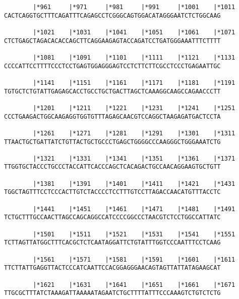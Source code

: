 \documentclass{article}
\begin{document}
\begin{Verbatim}
        |*961     |*971     |*981     |*991     |*1001    |*1011
CACTCAGGTGCTTTCAGATTTCAGAGCCTCGGGCAGTGGACATAGGGAATCTCTGGCAAG
                                                            
        |*1021    |*1031    |*1041    |*1051    |*1061    |*1071
CTCTGAGCTAGACACACCAGCTTCAGGAAGAGTACCAGATCCTGATGGGAAATTTCTTTT
                                                            
        |*1081    |*1091    |*1101    |*1111    |*1121    |*1131
CCCCATTCCTTTTCCCTCCTGAGTGGAGGGAGTCCTCTTCTTCGCCTCCCTGAGAATTGC
                                                            
        |*1141    |*1151    |*1161    |*1171    |*1181    |*1191
TGTGCTCTGTATTGAGAGCACCTGCCTGCTGACTTAGCTCAAAGGCAAGCCAGAACCCTT
                                                            
        |*1201    |*1211    |*1221    |*1231    |*1241    |*1251
CCCTGAAGACTGGCAAGAGGTGGTGTTTAGAGCAACGTCCAGGCTAAGAGATGACTCCTA
                                                            
        |*1261    |*1271    |*1281    |*1291    |*1301    |*1311
TTAACTGCTGATTATCTGTTACTGCTGCCCTGAGCTGGGGCCCAAGGGCTGGGAAATCTG
                                                            
        |*1321    |*1331    |*1341    |*1351    |*1361    |*1371
TTGGTGCTACCCTGCCCTACCATTCACCCAGCTCACAGACTGCCAACAGGAAGTGCTGTT
                                                            
        |*1381    |*1391    |*1401    |*1411    |*1421    |*1431
TGGCTAGTTTCCTCCCACTTGTCTACCCCTCCTTTGTCCTTAGACCAACATGTTTACCTC
                                                            
        |*1441    |*1451    |*1461    |*1471    |*1481    |*1491
TCTGCTTTGCCAACTTAGCCAGCAGGCCATCCCCGGCCCTAACGTCTCCTGGCCATTATC
                                                            
        |*1501    |*1511    |*1521    |*1531    |*1541    |*1551
TCTTAGTTATGGCTTTCACGCTCTCAATAGGATTCTGTATTTGGTCCCAATTTCCTCAAG
                                                            
        |*1561    |*1571    |*1581    |*1591    |*1601    |*1611
TTCTTATTGAGGTTACTCCCATCAATTCCACGGAGGGAACAGTAGTTATTATAGAAGCAT
                                                            
        |*1621    |*1631    |*1641    |*1651    |*1661    |*1671
TTGCGCTTTATCTAAAGATTAAAAATAGAATCTGCTTTTATTTCCCAAAGTCTGTCTCTG
                                                            

\end{Verbatim}
\end{document}
